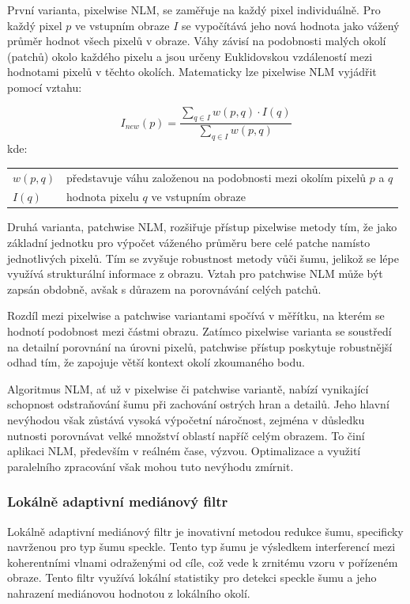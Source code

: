 \documentclass[male,czech,api_ing]{thesis}
\makeatletter
\newenvironment{conditions}[1][kde:]
    {#1 \begin{tabular}[t]{>{$}l<{$} @{${}={}$} >{\raggedright\arraybackslash}p{10cm}}}
    {\end{tabular}}
\makeatother
\begin{document}
První varianta, pixelwise NLM, se zaměřuje na každý pixel individuálně. Pro každý pixel $p$ ve vstupním obraze 
$I$ se vypočítává jeho nová hodnota jako vážený průměr hodnot všech pixelů v obraze. Váhy závisí na podobnosti malých okolí (patchů) okolo každého pixelu a jsou určeny Euklidovskou vzdáleností mezi hodnotami pixelů v těchto okolích. Matematicky lze pixelwise NLM vyjádřit pomocí vztahu:

\begin{equation}
    I_{new}(p) = \frac{\sum_{q \in I} w(p,q) \cdot I(q)}{\sum_{q \in I} w(p,q)}
\end{equation}
\begin{conditions}
    w(p,q) & představuje váhu založenou na podobnosti mezi okolím pixelů $p$ a $q$ \\
    I(q) & hodnota pixelu $q$ ve vstupním obraze
\end{conditions}

Druhá varianta, patchwise NLM, rozšiřuje přístup pixelwise metody tím, že jako základní jednotku pro výpočet váženého průměru bere celé patche namísto jednotlivých pixelů. Tím se zvyšuje robustnost metody vůči šumu, jelikož se lépe využívá strukturální informace z obrazu. Vztah pro patchwise NLM může být zapsán obdobně, avšak s důrazem na porovnávání celých patchů.

Rozdíl mezi pixelwise a patchwise variantami spočívá v měřítku, na kterém se hodnotí podobnost mezi částmi obrazu. Zatímco pixelwise varianta se soustředí na detailní porovnání na úrovni pixelů, patchwise přístup poskytuje robustnější odhad tím, že zapojuje větší kontext okolí zkoumaného bodu.

Algoritmus NLM, ať už v pixelwise či patchwise variantě, nabízí vynikající schopnost odstraňování šumu při zachování ostrých hran a detailů. Jeho hlavní nevýhodou však zůstává vysoká výpočetní náročnost, zejména v důsledku nutnosti porovnávat velké množství oblastí napříč celým obrazem. To činí aplikaci NLM, především v reálném čase, výzvou. Optimalizace a využití paralelního zpracování však mohou tuto nevýhodu zmírnit. \cite{NonLocalMeans}

\subsubsection{Lokálně adaptivní mediánový filtr}
Lokálně adaptivní mediánový filtr je inovativní metodou redukce šumu, specificky navrženou pro typ šumu speckle. Tento typ šumu je výsledkem interferencí mezi koherentními vlnami odraženými od cíle, což vede k zrnitému vzoru v pořízeném obraze. Tento filtr využívá lokální statistiky pro detekci speckle šumu a jeho nahrazení mediánovou hodnotou z lokálního okolí.
\end{document}

